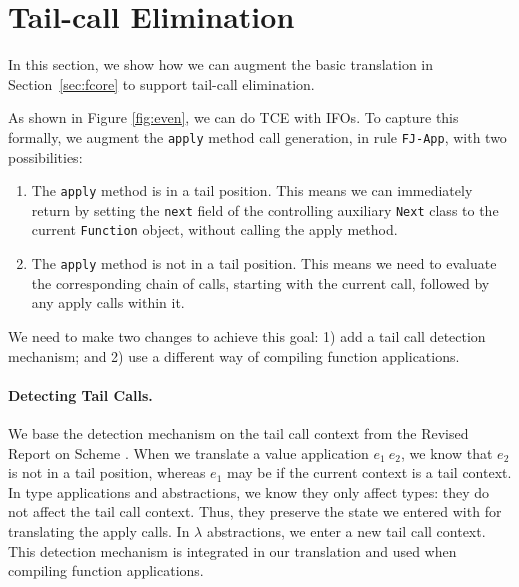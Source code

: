 \section{Tail-call Elimination}\label{sec:tce}

In this section, we show how we can augment the basic translation in
Section~\ref{sec:fcore} to support tail-call elimination.
 
As shown in Figure \ref{fig:even}, we can do TCE
with IFOs. To capture this formally, we augment the
\lstinline{apply} method call generation, in rule \texttt{FJ-App}, with two possibilities:

\begin{enumerate}

\item The \lstinline{apply} method is in a tail position. This means we can
  immediately return by setting the \texttt{next} field of the
  controlling auxiliary \lstinline{Next} class to the current \lstinline{Function} object,
  without calling the apply method.

\item The \lstinline{apply} method is not in a tail position. This means we
  need to evaluate the corresponding chain of calls, starting with the
  current call, followed by any apply calls within it. 

\end{enumerate}

We need to make two changes to achieve this goal: 1) add a tail call
detection mechanism; and 2) use a different way of compiling function
applications.

\paragraph{Detecting Tail Calls.}
We base the detection mechanism on the tail call context from the
Revised Report on Scheme \cite{Abelson1998}. When we translate a value
application $e_1~e_2$, we know that $e_2$ is not in a tail position,
whereas $e_1$ may be if the current context is a tail context.  In
type applications and abstractions, we know they only affect types: they do not
affect the tail call context.  Thus, they preserve the state we
entered with for translating the apply calls. In $\lambda$
abstractions, we enter a new tail call context. This detection mechanism 
is integrated in our translation and used when compiling function applications.

